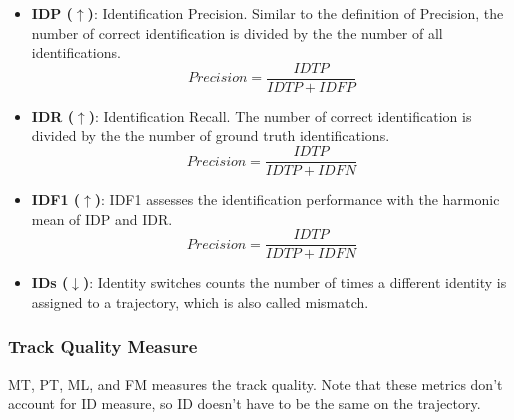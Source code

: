 \begin{itemize}

\item \textbf{IDP ($\uparrow$)}: Identification Precision. Similar to the definition of Precision, the number of correct identification is divided by the the number of all identifications.
\begin{equation}
Precision = \frac{IDTP}{IDTP + IDFP}
\end{equation}

\item \textbf{IDR ($\uparrow$)}: Identification Recall. The number of correct identification is divided by the the number of ground truth identifications.
\begin{equation}
Precision = \frac{IDTP}{IDTP + IDFN}
\end{equation}

\item \textbf{IDF1 ($\uparrow$)}: IDF1 assesses the identification performance with the harmonic mean of IDP and IDR. 
\begin{equation}
Precision = \frac{IDTP}{IDTP + IDFN}
\end{equation}

\item \textbf{IDs ($\downarrow$)}: Identity switches counts the number of times a different identity is assigned to a trajectory, which is also called mismatch.
\end{itemize}



\subsubsection{Track Quality Measure}
MT, PT, ML, and FM measures the track quality. Note that these metrics don't account for ID measure, so ID doesn't have to be the same on the trajectory.

